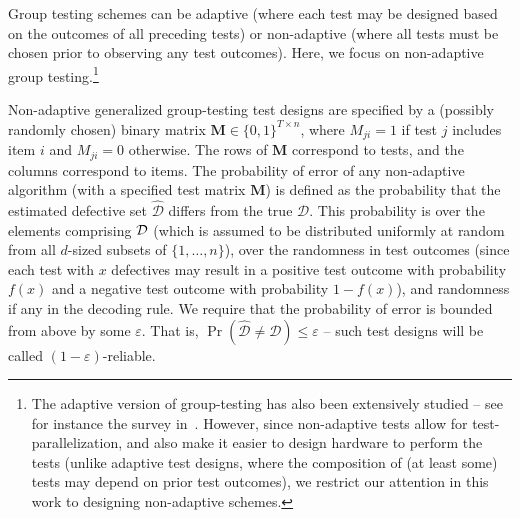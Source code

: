\documentclass[onecolumn,letterpaper]{IEEEtran}
\newcommand{\cD}{{\cal D}}
\begin{document}
Group testing schemes can be adaptive (where each test may be designed based on the outcomes of all preceding tests) or non-adaptive (where all tests must be chosen prior to observing any test outcomes). Here, we focus on non-adaptive group testing.\footnote{The adaptive version of group-testing has also been extensively studied -- see for instance the survey in~\cite{du2000combinatorial}. However, since non-adaptive tests allow for test-parallelization, and also make it easier to design hardware to perform the tests (unlike adaptive test designs, where the composition of (at least some) tests may depend on prior test outcomes), we restrict our attention in this work to designing non-adaptive schemes.} %

{
Non-adaptive generalized group-testing test designs are specified by a (possibly randomly chosen) binary matrix $\boldsymbol{M}\in\{0,1\}^{T\times n}$, where $M_{ji} = 1$ if test $j$ includes item $i$ and $M_{ji} = 0$ otherwise. The rows of $\boldsymbol{M}$ correspond to tests, and the columns correspond to items.  The probability of error of any non-adaptive algorithm (with a specified test matrix $\boldsymbol{M}$) is defined as the probability 
that the estimated defective set $\hat{\mathcal{D}}$ differs from the true $\mathcal{D}$. 
This probability is over the elements comprising $\cD$ (which is assumed to be distributed uniformly at random from all $d$-sized subsets of $\{1,\ldots,n\}$), over the randomness in test outcomes (since each test with $x$ defectives may result in a positive test outcome with probability $f(x)$ and a negative test outcome with probability $1-f(x)$), and randomness if any in the decoding rule.}
We require that the probability of error is bounded from above by some $\varepsilon$. That is,  $\Pr(\hat{\mathcal{D}}\neq \mathcal{D})\leq \varepsilon$ -- such test designs will be called $(1-\varepsilon)$-reliable. 


\end{document}
